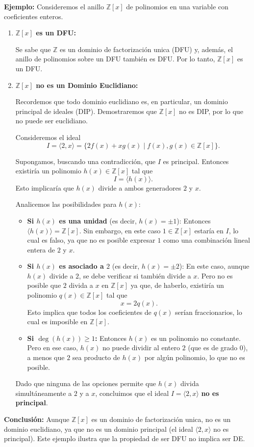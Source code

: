 \textbf{Ejemplo:} Consideremos el anillo $\mathbb{Z}[x]$ de polinomios en una variable con coeficientes enteros.

\begin{enumerate}
    \item \textbf{$\mathbb{Z}[x]$ es un DFU:}
    
    Se sabe que $\mathbb{Z}$ es un dominio de factorizaci\'on unica (DFU) y, adem\'as, el anillo de polinomios sobre un DFU tambi\'en es DFU. Por lo tanto, $\mathbb{Z}[x]$ es un DFU.
    
    \item \textbf{$\mathbb{Z}[x]$ no es un Dominio Euclidiano:}
    
    Recordemos que todo dominio euclidiano es, en particular, un dominio principal de ideales (DIP). Demostraremos que $\mathbb{Z}[x]$ no es DIP, por lo que no puede ser euclidiano.
    
    Consideremos el ideal
    \[
    I = \langle 2, x \rangle = \{2f(x) + xg(x) \mid f(x),g(x) \in \mathbb{Z}[x]\}.
    \]
    
    Supongamos, buscando una contradicci\'on, que $I$ es principal. Entonces existir\'ia un polinomio $h(x) \in \mathbb{Z}[x]$ tal que
    \[
    I = \langle h(x) \rangle.
    \]
    Esto implicar\'ia que $h(x)$ divide a ambos generadores $2$ y $x$.
    
    Analicemos las posibilidades para $h(x)$:
    
    \begin{itemize}
        \item \textbf{Si $h(x)$ es una unidad} (es decir, $h(x)=\pm 1$):  
        Entonces $\langle h(x) \rangle = \mathbb{Z}[x]$. Sin embargo, en este caso $1 \in \mathbb{Z}[x]$ estar\'ia en $I$, lo cual es falso, ya que no es posible expresar $1$ como una combinaci\'on lineal entera de $2$ y $x$.
    
        \item \textbf{Si $h(x)$ es asociado a $2$} (es decir, $h(x)=\pm 2$):  
        En este caso, aunque $h(x)$ divide a $2$, se debe verificar si tambi\'en divide a $x$. Pero no es posible que $2$ divida a $x$ en $\mathbb{Z}[x]$ ya que, de haberlo, existir\'ia un polinomio $q(x) \in \mathbb{Z}[x]$ tal que
        \[
        x = 2q(x).
        \]
        Esto implica que todos los coeficientes de $q(x)$ ser\'ian fraccionarios, lo cual es imposible en $\mathbb{Z}[x]$.
    
        \item \textbf{Si $\deg(h(x)) \ge 1$:}  
        Entonces $h(x)$ es un polinomio no constante. Pero en ese caso, $h(x)$ no puede dividir al entero $2$ (que es de grado $0$), a menos que $2$ sea producto de $h(x)$ por alg\'un polinomio, lo que no es posible.
    \end{itemize}
    
    Dado que ninguna de las opciones permite que $h(x)$ divida simult\'aneamente a $2$ y a $x$, concluimos que el ideal $I = \langle 2, x \rangle$ \textbf{no es principal}.
\end{enumerate}

\textbf{Conclusi\'on:} Aunque $\mathbb{Z}[x]$ es un dominio de factorizaci\'on unica, no es un dominio euclidiano, ya que no es un dominio principal (el ideal $\langle 2, x \rangle$ no es principal). Este ejemplo ilustra que la propiedad de ser DFU no implica ser DE.
